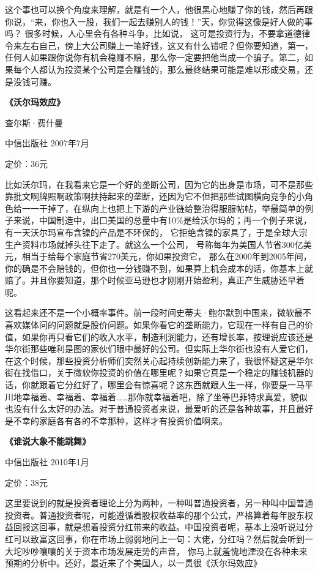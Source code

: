 这个事也可以换个角度来理解，就是有一个人，他很黑心地赚了你的钱，然后再跟你说，``来，你也入一股，我们一起去赚别人的钱！''天，你觉得这像是好人做的事吗？
很多时候，人心里会有各种斗争，比如说，
这可是投资行为，不要拿道德律令来左右自己，傍上大公司赚上一笔好钱，这又有什么错呢？但你要知道，第一，任何人如果跟你说你有机会稳赚不赔，那么你一定要把他当成一个骗子。第二，如果每个人都认为投资某个公司是会赚钱的，那么最终结果可能是难以形成交易，还是没钱可赚。

\textbf{《沃尔玛效应》}

查尔斯·费什曼

中信出版社 2007年7月

定价：36元

比如沃尔玛，在我看来它是一个好的垄断公司，因为它的出身是市场，可不是那些靠批文啊牌照啊政策啊扶持起来的垄断，还因为它不但把那些试图横向竞争的小角色给一一干掉了，在纵向上也把上下游的产业链给整治得服服帖帖，举最简单的例子来说，中国制造中，出口美国的总量中有10\%是给沃尔玛的；再一个例子来说，有一天沃尔玛宣布含镍的产品是不环保的，
它拒绝含镍的家具了，于是全球大宗生产资料市场就掉头往下走了。就这么一个公司，
号称每年为美国人节省300亿美元，相当于给每个家庭节省270美元，你如果投资它，
那么在2000年到2005年间，你的确是不会赔钱的，但你也一分钱赚不到，如果算上机会成本的话，你基本上就赔了。并且你要知道，那个时候亚马逊也才刚刚开始盈利，真正产生威胁还早着呢。

这看起来还不是一个小概率事件。前一段时间史蒂夫·鲍尔默到中国来，微软最不喜欢媒体问的问题就是股价问题。如果你看它的垄断能力，它现在一样有自己的价值，如果你再只看它们的收入水平，制造利润能力，还有增长率，按理说应该还是华尔街那些唯利是图的家伙们眼中最好的公司。但实际上华尔街也没有人爱它们，在这个时候，那些投资分析师们突然关心起持续创新能力来了，我很怀疑这是华尔街在找借口，关于微软你投资的价值在哪里呢？如果它真是一个稳定的赚钱机器的话，你就跟着它分红好了，哪里会有惊喜呢？这东西就跟人生一样，你要是一马平川地幸福着、幸福着、幸福着\ldots\ldots 那你就幸福着吧，除了坐等巴菲特求真爱，貌似也没有什么太好的办法。对于普通投资者来说，最爱听的还是各种故事，并且最好是不幸的家庭各有各的不幸那种，这样才有投资价值啊亲。

\textbf{《谁说大象不能跳舞》}

中信出版社 2010年1月

定价：38元

这里要说到的就是投资者理论上分为两种，一种叫普通投资者，另一种叫中国普通投资者。普通投资者呢，可能遵循着股权收益率的那个公式，严格算着每年股东权益回报这回事，就是想着投资分红带来的收益。中国投资者呢，基本上没听说过分红可以致富这回事，你在市场上弱弱地问上一句：大佬，分红吗？然后就会听到一大坨吵吵嚷嚷的关于资本市场发展走势的声音，
你马上就羞愧地湮没在各种未来预期的分析中。还好，最近来了个美国人，以一贯很《沃尔玛效应》

